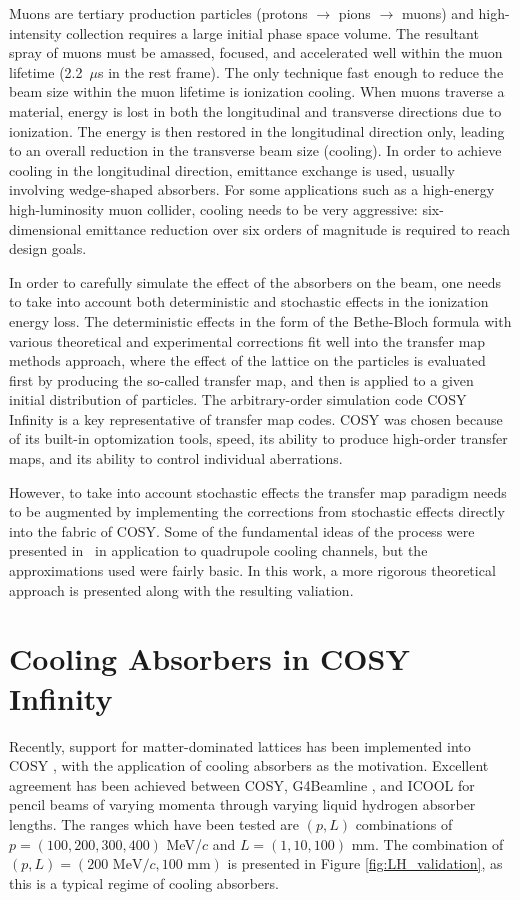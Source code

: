 \documentclass{jacow}
\begin{document}
Muons are tertiary production particles (protons $\rightarrow$ pions $\rightarrow$ muons) and high-intensity collection requires a large initial phase space volume. The resultant spray of muons must be amassed, focused, and accelerated well within the muon lifetime (2.2~$\mu$s in the rest frame). The only technique fast enough to reduce the beam size within the muon lifetime is ionization cooling. When muons traverse a material, energy is lost in both the longitudinal and transverse directions due to ionization. The energy is then restored in the longitudinal direction only, leading to an overall reduction in the transverse beam size (cooling). In order to achieve cooling in the longitudinal direction, emittance exchange is used, usually involving wedge-shaped absorbers. For some applications such as a high-energy high-luminosity muon collider, cooling needs to be very aggressive: six-dimensional emittance reduction over six orders of magnitude is required to reach design goals.

In order to carefully simulate the effect of the absorbers on the beam, one needs to take into account both deterministic and stochastic effects in the ionization energy loss. The deterministic effects in the form of the Bethe-Bloch formula with various theoretical and experimental corrections fit well into the transfer map methods approach, where the effect of the lattice on the particles is evaluated first by producing the so-called transfer map, and then is applied to a given initial distribution of particles. The arbitrary-order simulation code COSY Infinity \cite{COSY} is a key representative of transfer map codes. COSY was chosen because of its built-in optomization tools, speed, its ability to produce high-order transfer maps, and its ability to control individual aberrations. 

However, to take into account stochastic effects the transfer map paradigm needs to be augmented by implementing the corrections from stochastic effects directly into the fabric of COSY. Some of the fundamental ideas of the process were presented in~\cite{errede} in application to quadrupole cooling channels, but the approximations used were fairly basic. In this work, a more rigorous theoretical approach is presented along with the resulting valiation. 

\section{Cooling Absorbers in COSY Infinity}
Recently, support for matter-dominated lattices has been implemented into COSY \cite{ipac2015}, with the application of cooling absorbers as the motivation. Excellent agreement has been achieved between COSY, G4Beamline \cite{G4BL}, and ICOOL \cite{icool} for pencil beams of varying momenta through varying liquid hydrogen absorber lengths. The ranges which have been tested are $(p,L)$ combinations of $p=(100,200,300,400)$ MeV/$c$ and $L=(1,10,100)$ mm. The combination of $(p,L)=(200\text{ MeV/}c, 100\text{ mm})$ is presented in Figure \ref{fig:LH_validation}, as this is a typical regime of cooling absorbers.
\end{document}
